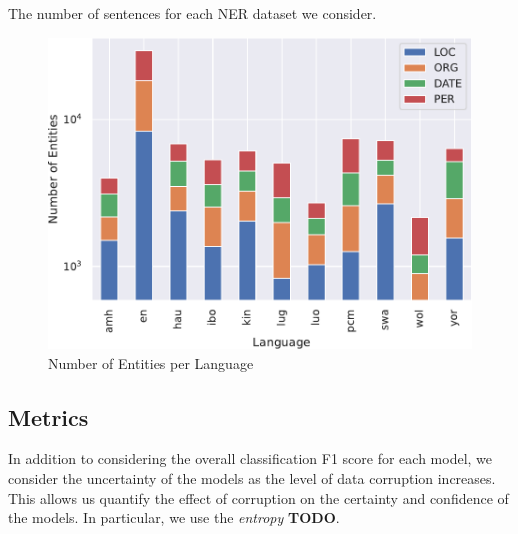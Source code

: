 \documentclass{article}
\newcommand{\mike}[1]{\textcolor{red}{#1}}
\begin{document}


\begin{table}[]
    \centering
    \caption{The number of sentences for each NER dataset we consider.}
    \label{tab:num_sentences}
    \begin{adjustbox}{width=1\linewidth}
    
    \end{adjustbox}
\end{table}

\begin{figure}
    \centering
    \includegraphics[width=1\linewidth]{images/number_entities.pdf}
    \caption{Number of Entities per Language}
    \label{fig:barchart_num_ents}
\end{figure}

\subsection{Metrics}
In addition to considering the overall classification F1 score for each model, we consider the uncertainty of the models as the level of data corruption increases. This allows us quantify the effect of corruption on the certainty and confidence of the models. In particular, we use the \textit{entropy} \textbf{TODO}.
\end{document}
